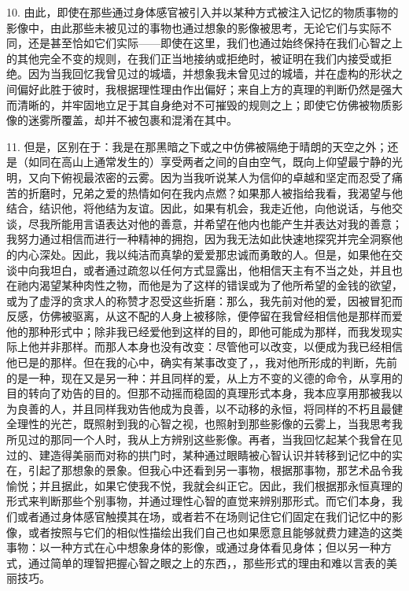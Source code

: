 10. 由此，即使在那些通过身体感官被引入并以某种方式被注入记忆的物质事物的影像中，由此那些未被见过的事物也通过想象的影像被思考，无论它们与实际不同，还是甚至恰如它们实际——即使在这里，我们也通过始终保持在我们心智之上的其他完全不变的规则，在我们正当地接纳或拒绝时，被证明在我们内接受或拒绝。因为当我回忆我曾见过的城墙，并想象我未曾见过的城墙，并在虚构的形状之间偏好此胜于彼时，我根据理性理由作出偏好；来自上方的真理的判断仍然是强大而清晰的，并牢固地立足于其自身绝对不可摧毁的规则之上；即使它仿佛被物质影像的迷雾所覆盖，却并不被包裹和混淆在其中。\par

11. 但是，区别在于：我是在那黑暗之下或之中仿佛被隔绝于晴朗的天空之外；还是（如同在高山上通常发生的）享受两者之间的自由空气，既向上仰望最宁静的光明，又向下俯视最浓密的云雾。因为当我听说某人为信仰的卓越和坚定而忍受了痛苦的折磨时，兄弟之爱的热情如何在我内点燃？如果那人被指给我看，我渴望与他结合，结识他，将他结为友谊。因此，如果有机会，我走近他，向他说话，与他交谈，尽我所能用言语表达对他的善意，并希望在他内也能产生并表达对我的善意；我努力通过相信而进行一种精神的拥抱，因为我无法如此快速地探究并完全洞察他的内心深处。因此，我以纯洁而真挚的爱爱那忠诚而勇敢的人。但是，如果他在交谈中向我坦白，或者通过疏忽以任何方式显露出，他相信天主有不当之处，并且也在祂内渴望某种肉性之物，而他是为了这样的错误或为了他所希望的金钱的欲望，或为了虚浮的贪求人的称赞才忍受这些折磨：那么，我先前对他的爱，因被冒犯而反感，仿佛被驱离，从这不配的人身上被移除，便停留在我曾经相信他是那样而爱他的那种形式中；除非我已经爱他到这样的目的，即他可能成为那样，而我发现实际上他并非那样。而那人本身也没有改变：尽管他可以改变，以便成为我已经相信他已是的那样。但在我的心中，确实有某事改变了，，我对他所形成的判断，先前的是一种，现在又是另一种：并且同样的爱，从上方不变的义德的命令，从享用的目的转向了劝告的目的。但那不动摇而稳固的真理形式本身，我本应享用那被我以为良善的人，并且同样我劝告他成为良善，以不动移的永恒，将同样的不朽且最健全理性的光芒，既照射到我的心智之视，也照射到那些影像的云雾上，当我思考我所见过的那同一个人时，我从上方辨别这些影像。再者，当我回忆起某个我曾在见过的、建造得美丽而对称的拱门时，某种通过眼睛被心智认识并转移到记忆中的实在，引起了那想象的景象。但我心中还看到另一事物，根据那事物，那艺术品令我愉悦；并且据此，如果它使我不悦，我就会纠正它。因此，我们根据那永恒真理的形式来判断那些个别事物，并通过理性心智的直觉来辨别那形式。而它们本身，我们或者通过身体感官触摸其在场，或者若不在场则记住它们固定在我们记忆中的影像，或者按照与它们的相似性描绘出我们自己也如果愿意且能够就费力建造的这类事物：以一种方式在心中想象身体的影像，或通过身体看见身体；但以另一种方式，通过简单的理智把握心智之眼之上的东西，，那些形式的理由和难以言表的美丽技巧。\par

